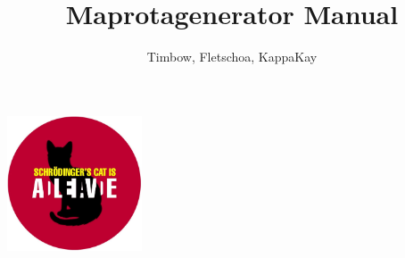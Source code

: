 \documentclass[a4paper, 11pt]{article}
\title{Maprotagenerator Manual}
\author{Timbow, Fletschoa, KappaKay}
\date{}
\begin{document}
\maketitle
\begin{center}
    \includegraphics[width=0.3\textwidth]{SK.jpg}
\end{center}

\newpage

\tableofcontents

\newpage






    
\end{document}
